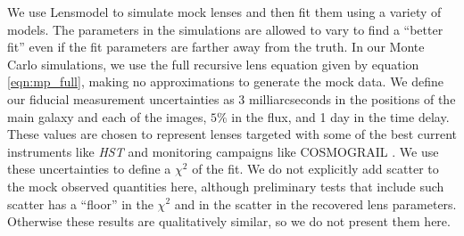 We use Lensmodel \citep{Keeton01} to simulate mock lenses and then fit them using a variety of models. The parameters in the simulations are allowed to vary to find a ``better fit'' even if the fit parameters are farther away from the truth. In our Monte Carlo simulations, we use the full recursive lens equation given by equation \ref{eqn:mp_full}, making no approximations to generate the mock data. We define our fiducial measurement uncertainties as 3 milliarcseconds in the positions of the main galaxy and each of the images, $5\%$ in the flux, and 1 day in the time delay. These values are chosen to represent lenses targeted with some of the best current instruments like \textit{HST} and monitoring campaigns like COSMOGRAIL \citep{Eigenbrod05}. We use these uncertainties to define a $\chi^2$ of the fit. We do not explicitly add scatter to the mock observed quantities here, although preliminary tests that include such scatter has a ``floor'' in the $\chi^2$ and in the scatter in the recovered lens parameters. Otherwise these results are qualitatively similar, so we do not present them here.